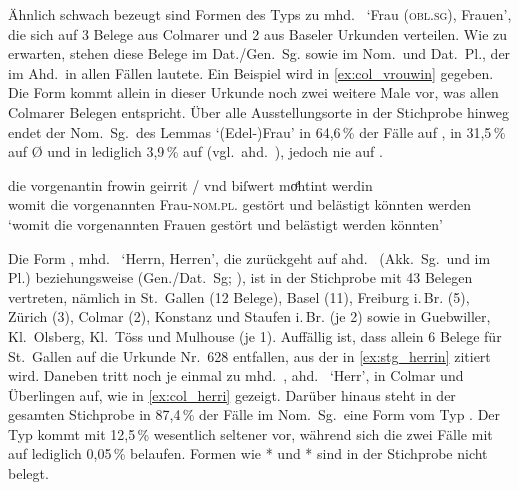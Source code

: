 Ähnlich schwach bezeugt sind Formen des Typs  zu
mhd.~ `Frau (\textsc{obl.sg}), Frauen', die sich auf 3 Belege aus
Colmarer und 2 aus Baseler Urkunden verteilen. Wie zu erwarten, stehen diese
Belege im Dat./Gen.~Sg. sowie im Nom.\ und Dat.~Pl., der im Ahd.\ in allen
Fällen  lautete. Ein Beispiel wird in \cref{ex:col_vrouwin}
gegeben. Die Form kommt allein in dieser Urkunde noch zwei weitere Male vor,
was allen Colmarer Belegen entspricht. Über alle Ausstellungsorte in der
Stichprobe hinweg endet der Nom.~Sg.\ des Lemmas  `(Edel-)Frau' in
64,6\,\% der Fälle auf , in 31,5\,\% auf Ø und in lediglich 3,9\,\% auf
 (vgl.~ahd.~), jedoch nie auf .

\begin{exe}
\ex\label{ex:col_vrouwin}
	 die vorgenantin frowin geirrit / vnd biſwert moͤhtint
			werdin \\
		womit die vorgenannten Frau-\textsc{nom.pl.\FemF} gestört {} und
			belästigt könnten werden \\
	\trans `womit die vorgenannten Frauen gestört und belästigt werden
		könnten'
		\parencites(Nr.~3293, Colmar, 1299)[446,24]{cao4}
\end{exe}

Die Form , mhd.~ `Herrn, Herren', die zurückgeht auf
ahd.~ (Akk.~Sg.\ und im Pl.) beziehungsweise
 (Gen./Dat.~Sg; \cite[vgl.][282--283]{braune2018}), ist in der
Stichprobe mit 43 Belegen vertreten, nämlich in St.~Gallen (12 Belege), Basel
(11), Freiburg i.\,Br. (5), Zürich (3), Colmar (2), Konstanz und Staufen
i.\,Br. (je 2) sowie in Guebwiller, Kl.~Olsberg, Kl.~Töss und Mulhouse (je 1).
Auffällig ist, dass allein 6 Belege für St.~Gallen auf die Urkunde Nr.~628
\autocite[55,35--57,7]{cao2} entfallen, aus der in \cref{ex:stg_herrin} zitiert
wird. Daneben tritt noch je einmal  zu mhd.~,
ahd.~ `Herr', in Colmar und Überlingen auf, wie in
\cref{ex:col_herri} gezeigt. Darüber hinaus steht in der gesamten Stichprobe in
87,4\,\% der Fälle im Nom.~Sg.\ eine Form vom Typ . Der Typ
 kommt mit 12,5\,\% wesentlich seltener vor, während sich die zwei
Fälle mit  auf lediglich 0,05\,\% belaufen. Formen wie *
und * sind in der Stichprobe nicht belegt.

